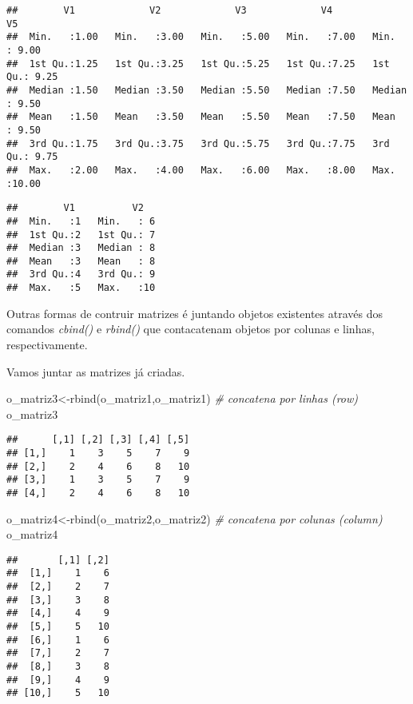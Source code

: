 \documentclass[
]{book}
\newenvironment{Shaded}{\begin{snugshade}}{\end{snugshade}}
\newcommand{\CommentTok}[1]{\textcolor[rgb]{0.56,0.35,0.01}{\textit{#1}}}
\newcommand{\FunctionTok}[1]{\textcolor[rgb]{0.00,0.00,0.00}{#1}}
\newcommand{\NormalTok}[1]{#1}
\newcommand{\OtherTok}[1]{\textcolor[rgb]{0.56,0.35,0.01}{#1}}
\begin{document}
\begin{verbatim}
##        V1             V2             V3             V4             V5       
##  Min.   :1.00   Min.   :3.00   Min.   :5.00   Min.   :7.00   Min.   : 9.00  
##  1st Qu.:1.25   1st Qu.:3.25   1st Qu.:5.25   1st Qu.:7.25   1st Qu.: 9.25  
##  Median :1.50   Median :3.50   Median :5.50   Median :7.50   Median : 9.50  
##  Mean   :1.50   Mean   :3.50   Mean   :5.50   Mean   :7.50   Mean   : 9.50  
##  3rd Qu.:1.75   3rd Qu.:3.75   3rd Qu.:5.75   3rd Qu.:7.75   3rd Qu.: 9.75  
##  Max.   :2.00   Max.   :4.00   Max.   :6.00   Max.   :8.00   Max.   :10.00
\end{verbatim}

\begin{verbatim}
##        V1          V2    
##  Min.   :1   Min.   : 6  
##  1st Qu.:2   1st Qu.: 7  
##  Median :3   Median : 8  
##  Mean   :3   Mean   : 8  
##  3rd Qu.:4   3rd Qu.: 9  
##  Max.   :5   Max.   :10
\end{verbatim}

Outras formas de contruir matrizes é juntando objetos existentes através dos comandos \emph{cbind()} e \emph{rbind()} que contacatenam objetos por colunas e linhas, respectivamente.

Vamos juntar as matrizes já criadas.

\begin{Shaded}
\begin{Highlighting}[]
\NormalTok{o\_matriz3}\OtherTok{\textless{}{-}}\FunctionTok{rbind}\NormalTok{(o\_matriz1,o\_matriz1) }\CommentTok{\# concatena por linhas (row)}
\NormalTok{o\_matriz3}
\end{Highlighting}
\end{Shaded}

\begin{verbatim}
##      [,1] [,2] [,3] [,4] [,5]
## [1,]    1    3    5    7    9
## [2,]    2    4    6    8   10
## [3,]    1    3    5    7    9
## [4,]    2    4    6    8   10
\end{verbatim}

\begin{Shaded}
\begin{Highlighting}[]
\NormalTok{o\_matriz4}\OtherTok{\textless{}{-}}\FunctionTok{rbind}\NormalTok{(o\_matriz2,o\_matriz2) }\CommentTok{\# concatena por colunas (column)}
\NormalTok{o\_matriz4}
\end{Highlighting}
\end{Shaded}

\begin{verbatim}
##       [,1] [,2]
##  [1,]    1    6
##  [2,]    2    7
##  [3,]    3    8
##  [4,]    4    9
##  [5,]    5   10
##  [6,]    1    6
##  [7,]    2    7
##  [8,]    3    8
##  [9,]    4    9
## [10,]    5   10
\end{verbatim}
\end{document}
